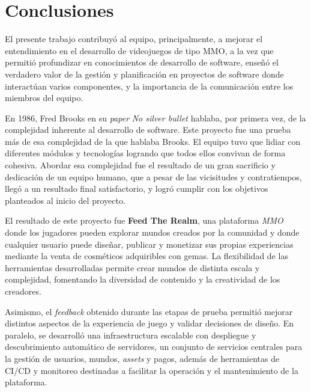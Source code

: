 \section{Conclusiones}

El presente trabajo contribuyó al equipo, principalmente, a mejorar el entendimiento en el desarrollo de videojuegos
de tipo MMO, a la vez que permitió profundizar en conocimientos de desarrollo de software, enseñó el verdadero valor
de la gestión y planificación en proyectos de software donde interactúan varios componentes, y la importancia de la 
comunicación entre los miembros del equipo.
\vspace{0.25cm}

En 1986, Fred Brooks en su \textit{paper} \textit{No silver bullet} hablaba, por primera vez, de la complejidad inherente 
al desarrollo de software. Este proyecto fue una prueba más de esa complejidad de la que hablaba Brooks. El equipo tuvo que lidiar con 
diferentes módulos y tecnologías logrando que todos ellos convivan de forma cohesiva. Abordar esa complejidad
fue el resultado de un gran sacrificio y dedicación de un
equipo humano, que a pesar de las vicisitudes y contratiempos, llegó a un resultado final satisfactorio, y logró cumplir con 
los objetivos planteados al inicio del proyecto.
\vspace{0.25cm}

El resultado de este proyecto fue \textbf{Feed The Realm}, una plataforma \textit{MMO} donde los jugadores pueden explorar
mundos creados por la comunidad y donde cualquier usuario puede diseñar, publicar y monetizar sus propias experiencias mediante
la venta de cosméticos adquiribles con gemas. La flexibilidad de las herramientas desarrolladas permite crear mundos de distinta
escala y complejidad, fomentando la diversidad de contenido y la creatividad de los creadores.

Asimismo, el \textit{feedback} obtenido durante las etapas de prueba permitió mejorar distintos aspectos de la experiencia de 
juego y validar decisiones de diseño. 
En paralelo, se desarrolló una infraestructura escalable con despliegue y descubrimiento automático de servidores, un conjunto de servicios centrales para
la gestión de usuarios, mundos, \textit{assets} y pagos, además de herramientas de CI/CD y monitoreo destinadas a facilitar la operación y el mantenimiento de la plataforma.


